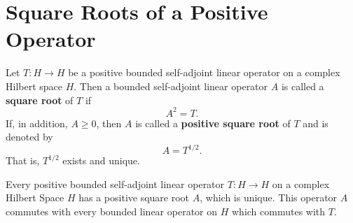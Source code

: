 \section{Square Roots of a Positive Operator}

\begin{theorem}
    Let \( T: H \to H  \) be a positive bounded self-adjoint linear operator on a complex Hilbert space \( H  \). Then a bounded self-adjoint linear operator \( A  \) is called a \textbf{square root} of \( T  \) if  
    \[  A^{2} = T.  \]
    If, in addition, \( A \geq 0  \), then \( A  \) is called a \textbf{positive square root} of \( T  \) and is denoted by
    \[  A = T^{1/2}. \]
    That is, \( T^{1/2}  \) exists and unique.
\end{theorem}

\begin{theorem}
Every positive bounded self-adjoint linear operator \( T: H \to H  \) on a complex Hilbert Space \( H  \) has a positive square root \( A  \), which is unique. This operator \( A  \) commutes with every bounded linear operator on \( H  \) which commutes with \( T  \).    
\end{theorem}
